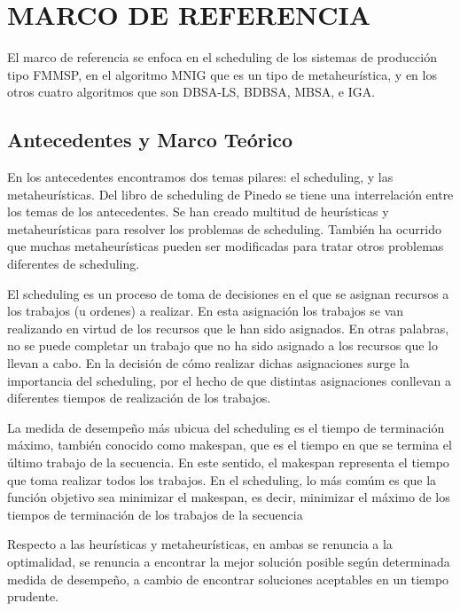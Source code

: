 \documentclass{article}
\begin{document}
\section{MARCO DE REFERENCIA}

El marco de referencia se enfoca en el scheduling de los sistemas de producción tipo FMMSP, en el algoritmo MNIG que es un tipo de metaheurística, y en los otros cuatro algoritmos que son DBSA-LS, BDBSA, MBSA, e IGA.

\subsection{Antecedentes y Marco Teórico}

En los antecedentes encontramos dos temas pilares: el scheduling, y las metaheurísticas. Del libro de scheduling de Pinedo \autocite{schedPinedo} se tiene una interrelación entre los temas de los antecedentes. Se han creado multitud de heurísticas y metaheurísticas para resolver los problemas de scheduling. También ha ocurrido que muchas metaheurísticas pueden ser modificadas para tratar otros problemas diferentes de scheduling.

\vspace{\baselineskip}
El scheduling es un proceso de toma de decisiones en el que se asignan recursos a los trabajos (u ordenes) a realizar. En esta asignación los trabajos se van realizando en virtud de los recursos que le han sido asignados. En otras palabras, no se puede completar un trabajo que no ha sido asignado a los recursos que lo llevan a cabo. En la decisión de cómo realizar dichas asignaciones surge la importancia del scheduling, por el hecho de que distintas asignaciones conllevan a diferentes tiempos de realización de los trabajos. \autocite{schedPinedo}

\vspace{\baselineskip}
La medida de desempeño más ubicua del scheduling es el tiempo de terminación máximo, también conocido como makespan, que es el tiempo en que se termina el último trabajo de la secuencia. En este sentido, el makespan representa el tiempo que toma realizar todos los trabajos. En el scheduling, lo más comúm es que la función objetivo sea minimizar el makespan, es decir, minimizar el máximo de los tiempos de terminación de los trabajos de la secuencia \autocite{schedPinedo}

\vspace{\baselineskip}
Respecto a las heurísticas y metaheurísticas, en ambas se renuncia a la optimalidad, se renuncia a encontrar la mejor solución posible según determinada medida de desempeño, a cambio de encontrar soluciones aceptables en un tiempo prudente. \autocite{metaTalbi}
\end{document}
